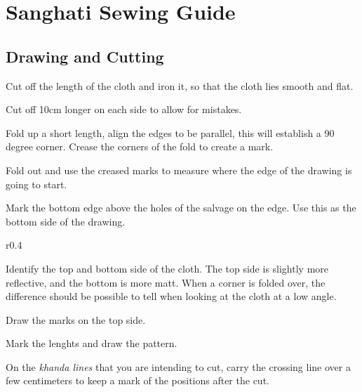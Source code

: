 \chapter{Sanghati Sewing Guide}

\section{Drawing and Cutting}

Cut off the length of the cloth and iron it, so that the cloth lies
smooth and flat.

Cut off 10cm longer on each side to allow for mistakes.

Fold up a short length, align the edges to be parallel, this will
establish a 90 degree corner. Crease the corners of the fold to create a
mark.

\setlength{\nextPhotoWidth}{0.5\textwidth}


Fold out and use the creased marks to measure where the edge of the
drawing is going to start.

Mark the bottom edge above the holes of the salvage on the edge. Use
this as the bottom side of the drawing.

\setlength{\nextPhotoWidth}{0.4\textwidth}

\begin{wrapfigure}[5]{r}{0.4\textwidth}


\end{wrapfigure}

Identify the top and bottom side of the cloth. The top side is slightly
more reflective, and the bottom is more matt. When a corner is folded
over, the difference should be possible to tell when looking at the
cloth at a low angle.

Draw the marks on the top side.

\clearpage

Mark the lenghts and draw the pattern.

On the \emph{khanda lines} that you are intending to cut, carry the
crossing line over a few centimeters to keep a mark of the positions
after the cut.

\setlength{\nextPhotoWidth}{0.5\textwidth}


